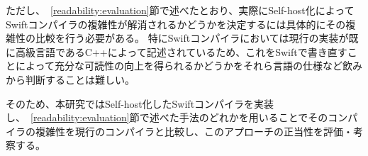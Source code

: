 ただし、~\ref{readability:evaluation}節で述べたとおり、実際にSelf-host化によってSwiftコンパイラの複雑性が解消されるかどうかを決定するには具体的にその複雑性の比較を行う必要がある。
特にSwiftコンパイラにおいては現行の実装が既に高級言語であるC++によって記述されているため、これをSwiftで書き直すことによって充分な可読性の向上を得られるかどうかをそれら言語の仕様など飲みから判断することは難しい。

そのため、本研究ではSelf-host化したSwiftコンパイラを実装し、~\ref{readability:evaluation}節で述べた手法のどれかを用いることでそのコンパイラの複雑性を現行のコンパイラと比較し、このアプローチの正当性を評価・考察する。

